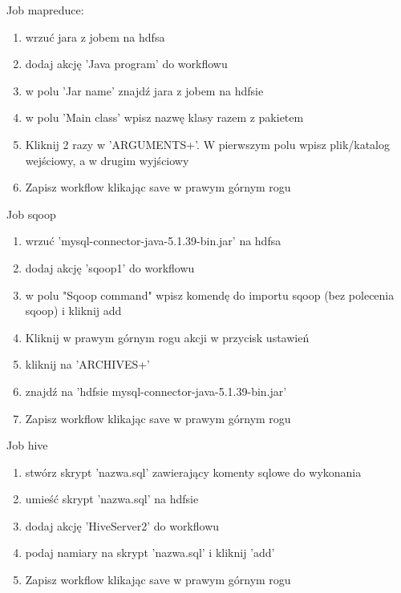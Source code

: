 \documentclass[11pt]{article}
\begin{document}
\pagebreak

Job mapreduce:
\begin{enumerate}
\item wrzuć jara z jobem na hdfsa
\item dodaj akcję 'Java program' do workflowu
\item w polu 'Jar name' znajdź jara z jobem na hdfsie
\item w polu 'Main class' wpisz nazwę klasy razem z pakietem
\item Kliknij 2 razy w 'ARGUMENTS+'. W pierwszym polu wpisz plik/katalog wejściowy, a w drugim wyjściowy
\item Zapisz workflow klikając save w prawym górnym rogu
\end{enumerate}

\pagebreak

Job sqoop
\begin{enumerate}
\item wrzuć 'mysql-connector-java-5.1.39-bin.jar' na hdfsa
\item dodaj akcję 'sqoop1' do workflowu
\item w polu "Sqoop command" wpisz komendę do importu sqoop (bez polecenia sqoop) i kliknij add
\item Kliknij w prawym górnym rogu akcji w przycisk ustawień
\item kliknij na 'ARCHIVES+'
\item znajdź na 'hdfsie mysql-connector-java-5.1.39-bin.jar'
\item Zapisz workflow klikając save w prawym górnym rogu
\end{enumerate}

\pagebreak

Job hive
\begin{enumerate}
\item stwórz skrypt 'nazwa.sql' zawierający komenty sqlowe do wykonania
\item umieść skrypt 'nazwa.sql' na hdfsie
\item dodaj akcję 'HiveServer2' do workflowu
\item podaj namiary na skrypt 'nazwa.sql' i kliknij 'add'
\item Zapisz workflow klikając save w prawym górnym rogu
\end{enumerate}
\end{document}
